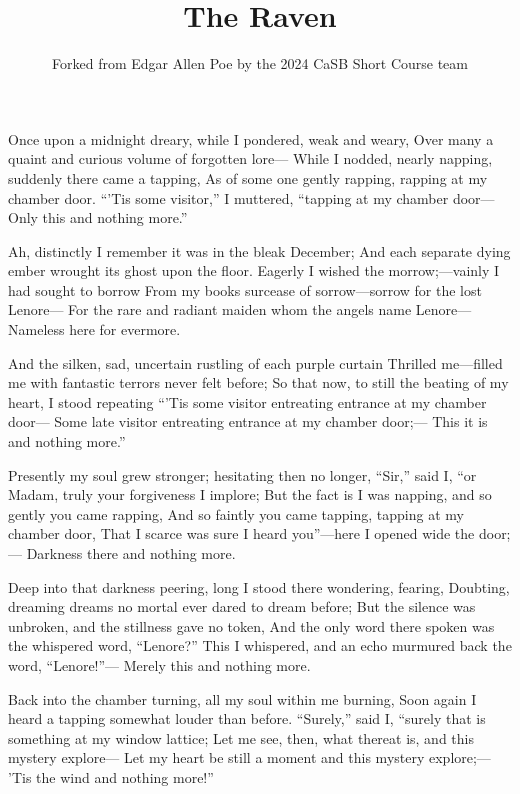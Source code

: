 \documentclass{article}
\title{The Raven}
\author{Forked from Edgar Allen Poe by the 2024 CaSB Short Course team}
\begin{document}
\maketitle 

Once upon a midnight dreary, while I pondered, weak and weary,
Over many a quaint and curious volume of forgotten lore—
    While I nodded, nearly napping, suddenly there came a tapping,
As of some one gently rapping, rapping at my chamber door.
``'Tis some visitor,” I muttered, “tapping at my chamber door—
            Only this and nothing more.”

    Ah, distinctly I remember it was in the bleak December;
And each separate dying ember wrought its ghost upon the floor.
    Eagerly I wished the morrow;—vainly I had sought to borrow
    From my books surcease of sorrow—sorrow for the lost Lenore—
For the rare and radiant maiden whom the angels name Lenore—
            Nameless here for evermore.

    And the silken, sad, uncertain rustling of each purple curtain
Thrilled me—filled me with fantastic terrors never felt before;
    So that now, to still the beating of my heart, I stood repeating
    ``'Tis some visitor entreating entrance at my chamber door—
Some late visitor entreating entrance at my chamber door;—
            This it is and nothing more.”

    Presently my soul grew stronger; hesitating then no longer,
    ``Sir,” said I, ``or Madam, truly your forgiveness I implore;
    But the fact is I was napping, and so gently you came rapping,
    And so faintly you came tapping, tapping at my chamber door,
That I scarce was sure I heard you”—here I opened wide the door;—
            Darkness there and nothing more.

    Deep into that darkness peering, long I stood there wondering, fearing,
Doubting, dreaming dreams no mortal ever dared to dream before;
    But the silence was unbroken, and the stillness gave no token,
    And the only word there spoken was the whispered word, “Lenore?”
This I whispered, and an echo murmured back the word, ``Lenore!”—
            Merely this and nothing more.

    Back into the chamber turning, all my soul within me burning,
Soon again I heard a tapping somewhat louder than before.
``Surely,” said I, “surely that is something at my window lattice;
      Let me see, then, what thereat is, and this mystery explore—
Let my heart be still a moment and this mystery explore;—
'Tis the wind and nothing more!”
\end{document}
